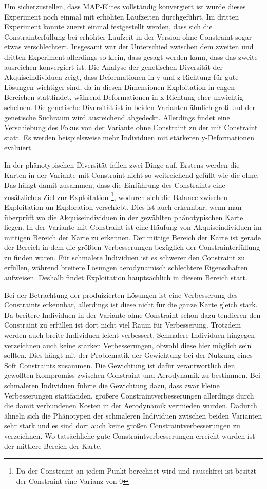 Um sicherzustellen, dass MAP-Elites vollständig konvergiert ist wurde dieses Experiment noch einmal mit erhöhten Laufzeiten durchgeführt.
Im dritten Experiment konnte zuerst einmal festgestellt werden, dass sich die Constrainterfüllung bei erhöhter Laufzeit in der Version ohne Constraint sogar etwas verschlechtert.
Insgesamt war der Unterschied zwischen dem zweiten und dritten Experiment allerdings so klein, dass gesagt werden kann, dass das zweite ausreichen konvergiert ist.
Die Analyse der genetischen Diversität der Akquiseindividuen zeigt, dass Deformationen in y und z-Richtung für gute Lösungen wichtiger sind, da in diesen Dimensionen Exploitation in engen Bereichen stattfindet, während Deformationen in x-Richtung eher unwichtig scheinen.
Die genetische Diversität ist in beiden Varianten ähnlich groß und der genetische Suchraum wird ausreichend abgedeckt.
Allerdings findet eine Verschiebung des Fokus von der Variante ohne Constraint zu der mit Constraint statt.
Es werden beispielsweise mehr Individuen mit stärkeren y-Deformationen evaluiert.

In der phänotypischen Diversität fallen zwei Dinge auf.
Erstens werden die Karten in der Variante mit Constraint nicht so weitreichend gefüllt wie die ohne.
Das hängt damit zusammen, dass die Einführung des Constraints eine zusätzliches Ziel zur Exploitation
\footnote{Da der Constraint an jedem Punkt berechnet wird und rauschfrei ist besitzt der Constraint eine Varianz von 0}, wodurch sich die Balance zwischen Exploitation un Exploration verschiebt.
Dies ist auch erkennbar, wenn man überprüft wo die Akquiseindividuen in der gewählten phänotypischen Karte liegen.
In der Variante mit Constraint ist eine Häufung von Akquiseindividuen im mittigen Bereich der Karte zu erkennen.
Der mittige Bereich der Karte ist gerade der Bereich in dem die größten Verbesserungen bezüglich der Constrainterfüllung zu finden waren.
Für schmalere Individuen ist es schwerer den Constraint zu erfüllen, während breitere Lösungen aerodynamisch schlechtere Eigenschaften aufweisen.
Deshalb findet Exploitation hauptsächlich in diesem Bereich statt.

Bei der Betrachtung der produizierten Lösungen ist eine Verbesserung des Constraints erkennbar, allerdings ist diese nicht für die ganze Karte gleich stark.
Da breitere Individuen in der Variante ohne Constraint schon dazu tendieren den Constraint zu erfüllen ist dort nicht viel Raum für Verbesserung.
Trotzdem werden auch breite Individuen leicht verbessert.
Schmalere Individuen hingegen verzeichnen auch keine starken Verbesserungen, obwohl diese hier möglich sein sollten.
Dies hängt mit der Problematik der Gewichtung bei der Nutzung eines Soft Constraints zusammen.
Die Gewichtung ist dafür verantwortlich den gewollten Kompromiss zwischen Constraint und Aerodynamik zu bestimmen.
Bei schmaleren Individuen führte die Gewichtung dazu, dass zwar kleine Verbesserungen stattfanden, größere Constraintverbesserungen allerdings durch die damit verbundenen Kosten in der Aerodynamik vermieden wurden.
Dadurch ähneln sich die Phänotypen der schmaleren Individuen zwischen beiden Varianten sehr stark und es sind dort auch keine großen Constraintverbesserungen zu verzeichnen.
Wo tatsächliche gute Constraintverbesserungen erreicht wurden ist der mittlere Bereich der Karte.

